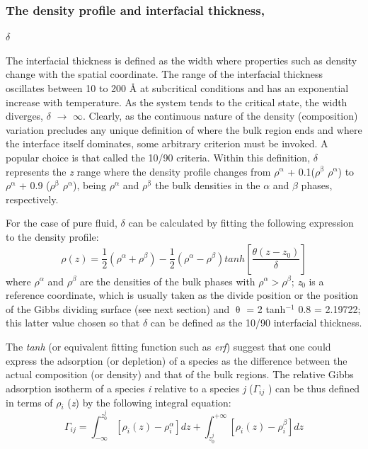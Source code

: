 \documentclass[9pt,bestpractices]{livecoms}
\begin{document}
\subsubsection{The density profile and interfacial thickness,} {${\delta}$}

The interfacial thickness is defined as the width where properties such as
density change with the spatial coordinate. The range of the interfacial
thickness oscillates between 10 to 200 \AA{} at subcritical conditions and has
an exponential increase with temperature. As the system tends to the critical
state, the width diverges, {${\delta}$} ${\rightarrow}$ ${\infty}$. Clearly, as
the continuous nature of the density (composition) variation precludes any
unique definition of where the bulk region ends and where the interface itself
dominates, some arbitrary criterion must be invoked. A popular choice is that
called the 10/90 criteria. Within this definition, {${\delta}$} represents the
\textit{z} range where the density profile changes from
${\rho}$$^{\mathrm{{\upalpha}}}$ + 0.1(${\rho}$$^{\mathrm{{\upbeta}}}$
\textendash{} ${\rho}$$^{\mathrm{{\upalpha}}}$) to
${\rho}$$^{\mathrm{{\upalpha}}}$ + 0.9 (${\rho}$$^{\mathrm{{\upbeta}}}$
\textendash{} ${\rho}$$^{\mathrm{{\upalpha}}}$), being
${\rho}$$^{\mathrm{{\upalpha}}}$ and ${\rho}$$^{\mathrm{{\upbeta}}}$ the bulk
densities in the {${\alpha}$} and {${\beta}$} phases, respectively.

For the case of pure fluid, {${\delta}$} can be calculated by fitting the following expression to the density profile\citep{evans1992}:
\begin{equation}
\rho\left(z\right)=\frac{1}{2}\left(\rho^{\alpha}+\rho^{\beta}\right)-\frac{1}{2}\left(\rho^{\alpha}-\rho^{\beta}\right)tanh\left[\frac{\theta\left(z-z_{0}\right)}{\delta}\right]
  \label{eq:3}
\end{equation}
where $\rho^\alpha$ and $\rho^\beta$ are the densities of the bulk phases with 
$\rho^\alpha > \rho^\beta$; \textit{z}$_{0}$ is a reference coordinate, which is usually taken as the
divide position or the position of the Gibbs dividing surface (see next
section) and {${\uptheta}$} = 2 tanh$^{-1}$ 0.8 = 2.19722; this latter value
chosen so that {${\delta}$} can be defined as the 10/90 interfacial thickness.

The \textit{tanh} (or equivalent fitting function such as \textit{erf}) suggest
that one could express the adsorption (or depletion) of a species as the
difference between the actual composition (or density) and that of the bulk
regions. The relative Gibbs adsorption isotherm of a species \textit{i}
relative to a species \textit{j} (${\Gamma}$$_{ij}$ ) can be thus defined in
terms of ${\rho}$$_{i}$ (\textit{z}) by the following integral
equation\citep{evans1992}:
\begin{equation}
\varGamma_{ij}=\int_{-\infty}^{z_{0}^{j}}\left[\rho_{i}\left(z\right)-\rho{}_{i}^{\alpha}\right]dz+\int_{z_{0}^{j}}^{+\infty}\left[\rho_{i}\left(z\right)-\rho{}_{i}^{\beta}\right]dz
 \label{eq:4}
\end{equation}
\end{document}

